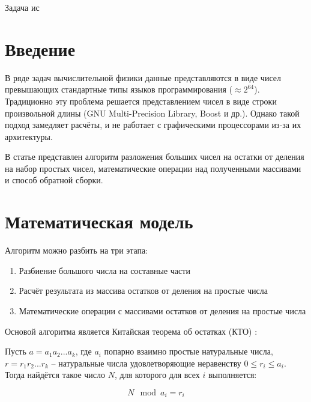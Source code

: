 \documentclass[10pt]{article}
\begin{document}
\makeface



\abstract Задача ис 



\section*{Введение}

В ряде задач вычислительной физики данные представляются в виде чисел превышающих стандартные типы языков программирования ($\approx 2^{64}$). Традиционно эту проблема решается представлением чисел в виде строки произвольной длины (GNU Multi-Precision Library, Boost и др.). Однако такой подход замедляет расчёты, и не работает с графическими процессорами из-за их архитектуры.

В статье представлен алгоритм разложения больших чисел на остатки от деления на набор простых чисел, математические операции над полученными массивами и способ обратной сборки.

\section{Математическая модель} 

Алгоритм можно разбить на три этапа: 

\begin{enumerate}
	\item Разбиение большого числа на составные части
	\item Расчёт результата из массива остатков от деления на простые числа
	\item Математические операции с массивами остатков от деления на простые числа
\end{enumerate}

Основой алгоритма является Китайская теорема об остатках (КТО) \cite{Cormen2001}:

Пусть $a = a_1 a_2 ... a_k$, где $a_i$ попарно взаимно простые натуральные числа, $r = r_1 r_2 ... r_k$ -- натуральные числа удовлетворяющие неравенству $0 \leq r_i \le a_i$. Тогда найдётся такое число
$N$, для которого для всех $i$ выполняется:

\begin{equation}
	N \mod a_i = r_i
	\label{eq:rem_th}
\end{equation}
\end{document}
